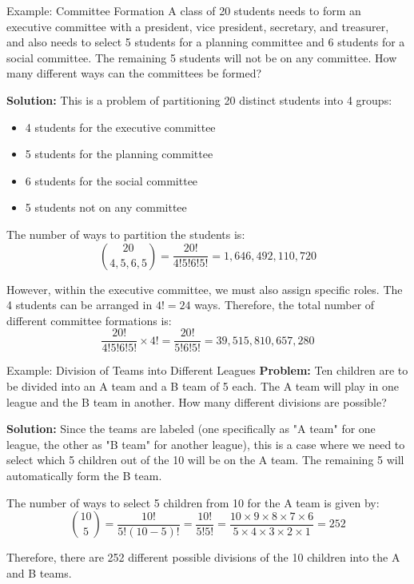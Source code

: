 \begin{exampleboxbreak}{Example: Committee Formation}
    A class of 20 students needs to form an executive committee with a president, vice president, secretary, and treasurer, and also needs to select 5 students for a planning committee and 6 students for a social committee. The remaining 5 students will not be on any committee. How many different ways can the committees be formed?

    \textbf{Solution:} This is a problem of partitioning 20 distinct students into 4 groups:
    \begin{itemize}
        \item 4 students for the executive committee
        \item 5 students for the planning committee
        \item 6 students for the social committee
        \item 5 students not on any committee
    \end{itemize}

    The number of ways to partition the students is:
    \[
    \binom{20}{4, 5, 6, 5} = \frac{20!}{4!5!6!5!} = 1,646,492,110,720
    \]

    However, within the executive committee, we must also assign specific roles. The 4 students can be arranged in $4! = 24$ ways. Therefore, the total number of different committee formations is:
    \[
    \frac{20!}{4!5!6!5!} \times 4! = \frac{20!}{5!6!5!} = 39,515,810,657,280
    \]
\end{exampleboxbreak}

\begin{exampleboxbreak}{Example: Division of Teams into Different Leagues}
        \textbf{Problem:} Ten children are to be divided into an A team and a B team of 5 each. The A team will play in one league and the B team in another. How many different divisions are possible?

        \textbf{Solution:} Since the teams are labeled (one specifically as "A team" for one league, the other as "B team" for another league), this is a case where we need to select which 5 children out of the 10 will be on the A team. The remaining 5 will automatically form the B team.

        The number of ways to select 5 children from 10 for the A team is given by:
        \[
        \binom{10}{5} = \frac{10!}{5!(10-5)!} = \frac{10!}{5!5!} = \frac{10 \times 9 \times 8 \times 7 \times 6}{5 \times 4 \times 3 \times 2 \times 1} = 252
        \]

        Therefore, there are 252 different possible divisions of the 10 children into the A and B teams.
\end{exampleboxbreak}

